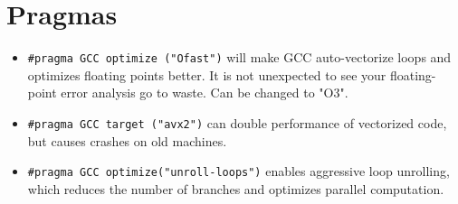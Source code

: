 \section*{Pragmas}
	\begin{itemize}
		\item \lstinline{#pragma GCC optimize ("Ofast")} will make GCC auto-vectorize loops and optimizes floating points better. 
		It is not unexpected to see your floating-point error analysis go to waste. Can be changed to "O3".
		\item \lstinline{#pragma GCC target ("avx2")} can double performance of vectorized code, but causes crashes on old machines.
		\item \lstinline{#pragma GCC optimize("unroll-loops")} enables aggressive loop unrolling, which reduces the number of branches and optimizes parallel computation.
	\end{itemize}
